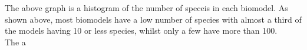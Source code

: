 \documentclass[portrait,a0paper,fontscale=0.35]{baposter}
\begin{document}
\begin{poster}
{ \begin{multicols}{2}
 The above graph is a histogram of the number of speceis in each biomodel. As shown above, most biomodels have a low number of species with almost a third of the models having 10 or less species, whilst only a few have more than 100.\\
   
 The a
\end{multicols}}
\end{poster}
\end{document}
